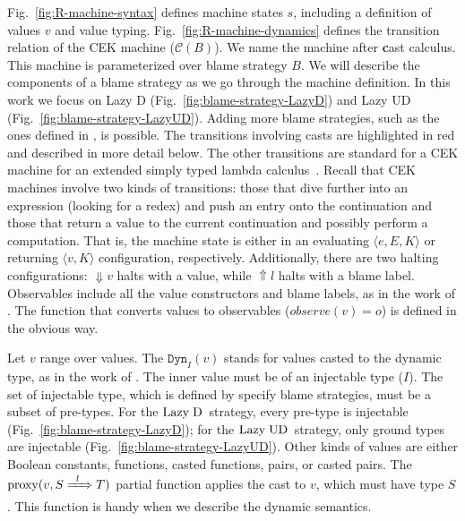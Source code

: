 \documentclass[runningheads]{llncs}
\newcommand{\LUD}{\ensuremath{\text{Lazy\;UD}}}
\newcommand{\LD}{\ensuremath{\text{Lazy\;D}}}
\newcommand{\CMachine}[1]{\ensuremath{\mathcal{C}(#1)}}
\newcommand{\error}[1]{\ensuremath{\Uparrow#1}}
\newcommand{\Pbool}[0]{\ensuremath{\mathtt{Bool}}}
\newcommand{\etrue}[0]{\mathtt{true}}
\newcommand{\ecast}[2]{\ensuremath{#1 : #2}}
\newcommand{\ccast}[3]{#1 \xRightarrow[]{\enskip #2 \enskip} #3}
\newcommand{\vdyn}[2]{\mathtt{Dyn}_{#1}(#2)}
\newcommand{\sexpr}[3]{\ensuremath{\langle#1,#2,#3\rangle}}
\newcommand{\scont}[2]{\ensuremath{\langle#1,#2\rangle}}
\newcommand{\shalt}[1]{\ensuremath{\mathop{\Downarrow} #1}}
\newcommand{\proxy}[2]{\ensuremath{\mathrm{proxy}(#1,#2)}}
\begin{document}
Fig.~\ref{fig:R-machine-syntax} defines machine 
states $s$, including a definition of values $v$ and value typing.
Fig.~\ref{fig:R-machine-dynamics} defines the transition relation of the CEK
machine (\CMachine{B}).
We name the machine after \textbf{c}ast calculus.
%
This machine is parameterized over blame strategy $B$. We will describe
the components of a blame strategy as we go through the machine definition.
In this work we focus on Lazy D (Fig.~\ref{fig:blame-strategy-LazyD}) and Lazy UD 
(Fig.~\ref{fig:blame-strategy-LazyUD}). Adding more blame strategies, 
such as the ones defined in \cite{siek2009exploring}, is possible.
%
The transitions involving casts are highlighted in red and described in
more detail below. The other transitions are standard for a CEK
machine for an extended simply typed lambda calculus~\citep{Felleisen:2009aa}.
%
Recall that CEK machines involve two kinds of transitions: those that
dive further into an expression (looking for a redex) and push an
entry onto the continuation and those that return a value to the
current continuation and possibly perform a computation.  That is, the
machine state is either in an evaluating $\sexpr{e}{E}{K}$ or
returning $\scont{v}{K}$ configuration, respectively. Additionally,
there are two halting configurations: \shalt{v} halts with a value,
while \error{l} halts with a blame label.  Observables include all the
value constructors and blame labels, as in the work of
\citet{siek2012interpretations}.  The function that converts values to
observables ($observe(v) = o$) is defined in the obvious way.

Let $v$ range over values. The $\vdyn{I}{v}$ stands for values casted
to the dynamic type, as in the work of \citet{wadler2009well}. The
inner value must be of an injectable type ($I$).
The set of injectable type, which is defined by specify blame strategies,
must be a subset of pre-types.
%
For the \LD\ strategy, every pre-type is injectable 
(Fig.~\ref{fig:blame-strategy-LazyD});
%
for the \LUD\ strategy, only ground types are injectable 
(Fig.~\ref{fig:blame-strategy-LazyUD}).
%
Other kinds of values are either Boolean constants, functions, casted 
functions, pairs, or casted pairs.
%
The \proxy{v}{\ccast{S}{l}{T}} partial function applies the cast to $v$, which must
have type $S$. This function is handy when we describe the dynamic semantics.
\end{document}
